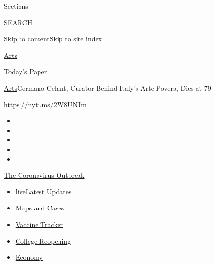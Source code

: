 Sections

SEARCH

\protect\hyperlink{site-content}{Skip to
content}\protect\hyperlink{site-index}{Skip to site index}

\href{https://www.nytimes3xbfgragh.onion/section/arts}{Arts}

\href{https://myaccount.nytimes3xbfgragh.onion/auth/login?response_type=cookie\&client_id=vi}{}

\href{https://www.nytimes3xbfgragh.onion/section/todayspaper}{Today's
Paper}

\href{/section/arts}{Arts}\textbar{}Germano Celant, Curator Behind
Italy's Arte Povera, Dies at 79

\url{https://nyti.ms/2W8UNJm}

\begin{itemize}
\item
\item
\item
\item
\item
\end{itemize}

\href{https://www.nytimes3xbfgragh.onion/news-event/coronavirus?action=click\&pgtype=Article\&state=default\&region=TOP_BANNER\&context=storylines_menu}{The
Coronavirus Outbreak}

\begin{itemize}
\tightlist
\item
  live\href{https://www.nytimes3xbfgragh.onion/2020/08/04/world/coronavirus-covid-19.html?action=click\&pgtype=Article\&state=default\&region=TOP_BANNER\&context=storylines_menu}{Latest
  Updates}
\item
  \href{https://www.nytimes3xbfgragh.onion/interactive/2020/us/coronavirus-us-cases.html?action=click\&pgtype=Article\&state=default\&region=TOP_BANNER\&context=storylines_menu}{Maps
  and Cases}
\item
  \href{https://www.nytimes3xbfgragh.onion/interactive/2020/science/coronavirus-vaccine-tracker.html?action=click\&pgtype=Article\&state=default\&region=TOP_BANNER\&context=storylines_menu}{Vaccine
  Tracker}
\item
  \href{https://www.nytimes3xbfgragh.onion/2020/08/02/us/covid-college-reopening.html?action=click\&pgtype=Article\&state=default\&region=TOP_BANNER\&context=storylines_menu}{College
  Reopening}
\item
  \href{https://www.nytimes3xbfgragh.onion/live/2020/08/03/business/stock-market-today-coronavirus?action=click\&pgtype=Article\&state=default\&region=TOP_BANNER\&context=storylines_menu}{Economy}
\end{itemize}


